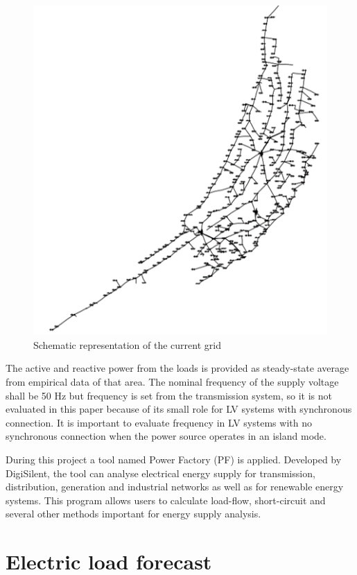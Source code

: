 \begin{figure}[h]
    \centering
    \includegraphics[scale=0.7]{thesis-latex/img/gridbase.png}
    \caption{Schematic representation of the current grid}
    \label{fig:grid}
\end{figure}

The active and reactive power from the loads is provided as steady-state average from empirical data of that area. The nominal frequency of the supply voltage shall be 50
Hz but frequency is set from the transmission system, so it is
not evaluated in this paper because of its small role for LV
systems with synchronous connection. It is important to
evaluate frequency in LV systems with no synchronous
connection when the power source operates in an island mode. %

During this project a tool named Power Factory (PF) is applied. Developed by DigiSilent, the tool can analyse electrical energy supply for transmission, distribution, generation and industrial networks as well as for renewable energy systems. This program allows users to calculate load-flow, short-circuit and several other methods important for energy supply analysis.~\cite{noauthor_powerfactory_nodate}

\section{Electric load forecast}

